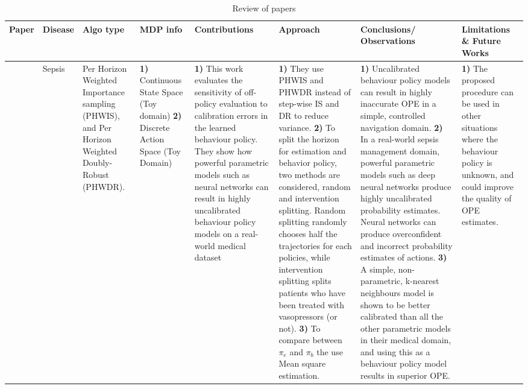 \begin{table}[!th]
\caption{Review of papers}
\label{tab:review4}
\begin{tabular}{|p{3 em}|p{3 em}|p{3 em}|p{3em}|p{6em}|p{8em}|p{7 em}|p{6em}|}
\toprule
Paper  & Disease  & Algo type & MDP info & Contributions  & Approach & Conclusions/ Observations  & Limitations \& Future Works \\
\hline
\citet{DBLP:journals/corr/abs-1807-01066} & Sepsis 
& 
Per Horizon Weighted Importance sampling (PHWIS), and Per Horizon Weighted Doubly-Robust (PHWDR).
& 
\textbf{1)} Continuous State Space (Toy domain)
\textbf{2)} Discrete Action Space (Toy Domain)
&  
\textbf{1)} This work evaluates the sensitivity of off-policy evaluation
to calibration errors in the learned behaviour policy. They show how powerful parametric models such as neural networks can result in highly uncalibrated behaviour policy models on a real-world medical dataset
&
\textbf{1)} They use PHWIS and PHWDR instead of step-wise IS and DR to reduce variance. \textbf{2)} To split the horizon for estimation and behavior policy, two methods are considered, random and intervention splitting. Random splitting randomly chooses half the trajectories for each policies, while intervention splitting splits patients who have been treated with vasopressors (or not).  \textbf{3)} To compare between $\pi_e$ and $\pi_b$ the use Mean square estimation.
& 
\textbf{1)} Uncalibrated behaviour policy models can result in
highly inaccurate OPE in a simple, controlled navigation
domain.
\textbf{2)} In a real-world sepsis management domain, powerful
parametric models such as deep neural networks produce
highly uncalibrated probability estimates. Neural networks can produce overconfident and incorrect probability estimates of actions.
\textbf{3)} A simple, non-parametric, k-nearest neighbours model
is shown to be better calibrated than all the other parametric models
in their medical domain, and using this as a behaviour
policy model results in superior OPE.
& 
\textbf{1)} The proposed
procedure can be used in other situations where the
behaviour policy is unknown, and could improve the quality
of OPE estimates.
   \\\midrule
\end{tabular}
\vspace*{-2em}
\end{table}   


